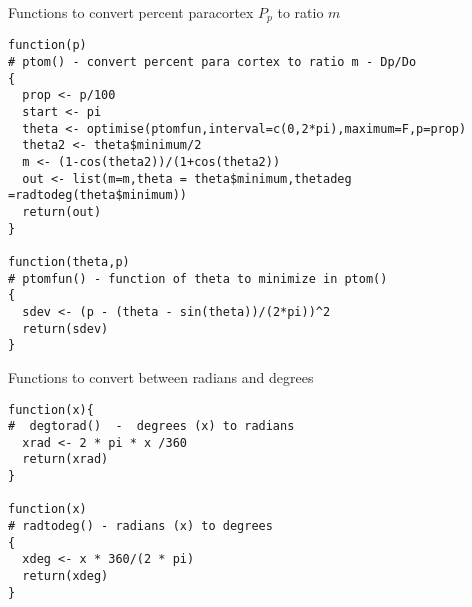 \documentclass[titlepage]{article}  %
\begin{document}
Functions to convert percent paracortex $P_{p}$ to ratio $m$
\begin{verbatim}
function(p)
# ptom() - convert percent para cortex to ratio m - Dp/Do
{
  prop <- p/100
  start <- pi
  theta <- optimise(ptomfun,interval=c(0,2*pi),maximum=F,p=prop)
  theta2 <- theta$minimum/2
  m <- (1-cos(theta2))/(1+cos(theta2))
  out <- list(m=m,theta = theta$minimum,thetadeg =radtodeg(theta$minimum))
  return(out)
}

function(theta,p)
# ptomfun() - function of theta to minimize in ptom()
{
  sdev <- (p - (theta - sin(theta))/(2*pi))^2
  return(sdev)
}

\end{verbatim}

Functions to convert between radians and degrees
\begin{verbatim}
function(x){
#  degtorad()  -  degrees (x) to radians
  xrad <- 2 * pi * x /360
  return(xrad)
}

function(x)
# radtodeg() - radians (x) to degrees
{
  xdeg <- x * 360/(2 * pi)
  return(xdeg)
}
\end{verbatim}
\end{document}
